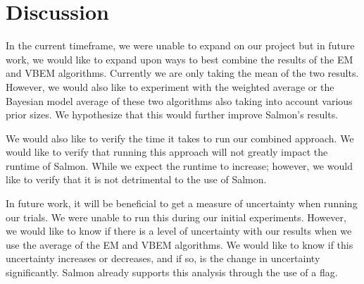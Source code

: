 \section{Discussion}

In the current timeframe, we were unable to expand on our project but in future work, we would like to expand upon ways to best combine the results of the EM and VBEM algorithms. Currently we are only taking the mean of the two results. However, we would also like to experiment with the weighted average or the Bayesian model average of these two algorithms also taking into account various prior sizes. We hypothesize that this would further improve Salmon’s results. \cite{doi:10.1177/2515245919898657}


We would also like to verify the time it takes to run our combined approach. We would like to verify that running this approach will not greatly impact the runtime of Salmon. While we expect the runtime to increase; however, we would like to verify that it is not detrimental to the use of Salmon. 

In future work, it will be beneficial to get a measure of uncertainty when running our trials. We were unable to run this during our initial experiments. However, we would like to know if there is a level of uncertainty with our results when we use the average of the EM and VBEM algorithms. We would like to know if this uncertainty increases or decreases, and if so, is the change in uncertainty significantly. Salmon already supports this analysis through the use of a flag. 
